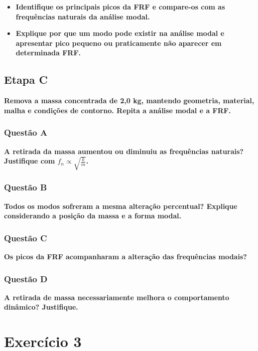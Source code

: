 \documentclass[a4paper, 12pt]{article}
\begin{document}
\begin{itemize}
    \item \textbf{Identifique os principais picos da FRF e compare-os com as frequências naturais da análise modal.} 
    \item \textbf{Explique por que um modo pode existir na análise modal e apresentar pico pequeno ou praticamente não aparecer em determinada FRF.}
\end{itemize}

\subsection{Etapa C}

\textbf{Remova a massa concentrada de 2,0 kg, mantendo geometria, material, malha e condições de contorno. 
Repita a análise modal e a FRF.}

\subsubsection{Questão A}

\textbf{A retirada da massa aumentou ou diminuiu as frequências naturais? Justifique com $f_n \propto \sqrt{\frac{k}{m}}$.} 

\subsubsection{Questão B}

\textbf{Todos os modos sofreram a mesma alteração percentual? Explique considerando a posição da massa e a forma modal.} 

\subsubsection{Questão C}

\textbf{Os picos da FRF acompanharam a alteração das frequências modais?}

\subsubsection{Questão D}

\textbf{A retirada de massa necessariamente melhora o comportamento dinâmico? Justifique.}


\section{Exercício 3}
\end{document}

